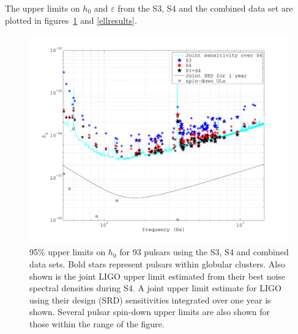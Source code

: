 The upper limits on $h_0$ and $\varepsilon$ from the S3, S4 and the combined data set are plotted in
figures~\ref{h0results}
and \ref{ellresults}.
\begin{figure}[!htbp]
\begin{center}
\includegraphics[width=1.0\textwidth]{figs/upperlimits}\caption[95\% upper limits on $h_0$ for 93
pulsars using the S3, S4 and combined data sets.]{95\% upper limits on $h_0$ for 93 pulsars using
the S3, S4 and combined data sets. Bold stars represent pulsars within globular clusters. Also shown
is the joint LIGO upper limit estimated from their best noise spectral densities during S4. A joint
upper limit estimate for LIGO using their design (SRD) sensitivities integrated over one year is
shown. Several pulsar spin-down upper limits are also shown for those within the range of the
figure.}\label{h0results}
\end{center}
\end{figure}
